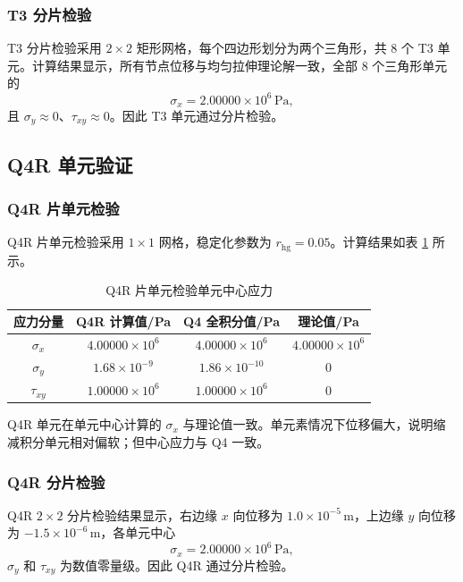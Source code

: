 \documentclass[UTF8,a4paper,zihao=-4]{ctexart}
\begin{document}
\subsubsection{T3 分片检验}

T3 分片检验采用 $2\times2$ 矩形网格，每个四边形划分为两个三角形，共 8 个 T3 单元。计算结果显示，所有节点位移与均匀拉伸理论解一致，全部 8 个三角形单元的
\[
    \sigma_x = 2.00000\times10^6\,\mathrm{Pa},
\]
且 $\sigma_y\approx0$、$\tau_{xy}\approx0$。因此 T3 单元通过分片检验。

\subsection{Q4R 单元验证}

\subsubsection{Q4R 片单元检验}

Q4R 片单元检验采用 $1\times1$ 网格，稳定化参数为 $r_{\mathrm{hg}}=0.05$。计算结果如表 \ref{tab:q4r_patch_stress} 所示。

\begin{table}[H]
    \centering
    \caption{Q4R 片单元检验单元中心应力}
    \label{tab:q4r_patch_stress}
    \begin{tabular}{cccc}
        \toprule
        应力分量 & Q4R 计算值/Pa & Q4 全积分值/Pa & 理论值/Pa\\
        \midrule
        $\sigma_x$ & $4.00000\times10^{6}$ & $4.00000\times10^{6}$ & $4.00000\times10^{6}$\\
        $\sigma_y$ & $1.68\times10^{-9}$ & $1.86\times10^{-10}$ & $0$\\
        $\tau_{xy}$ & $1.00000\times10^{6}$ & $1.00000\times10^{6}$ & $0$\\
        \bottomrule
    \end{tabular}
\end{table}

Q4R 单元在单元中心计算的 $\sigma_x$ 与理论值一致。单元素情况下位移偏大，说明缩减积分单元相对偏软；但中心应力与 Q4 一致。

\subsubsection{Q4R 分片检验}

Q4R $2\times2$ 分片检验结果显示，右边缘 $x$ 向位移为 $1.0\times10^{-5}\,\mathrm{m}$，上边缘 $y$ 向位移为 $-1.5\times10^{-6}\,\mathrm{m}$，各单元中心
\[
    \sigma_x = 2.00000\times10^6\,\mathrm{Pa},
\]
$\sigma_y$ 和 $\tau_{xy}$ 为数值零量级。因此 Q4R 通过分片检验。
\end{document}
